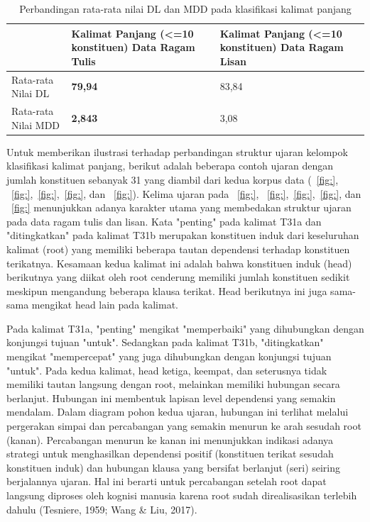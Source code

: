 \begin{table}
\begin{center}
 \label{table:DL_MDD_panjang}
 \caption{Perbandingan rata-rata nilai DL dan MDD pada klasifikasi kalimat panjang}
\begin{tabular}{ |p{4cm} | p{4cm} | p{4cm} |}
    \hline
 & Kalimat Panjang \newline (\textless =10 konstituen) \newline Data Ragam Tulis & Kalimat Panjang \newline (\textless =10 konstituen) \newline Data Ragam Lisan \\ \hline
 Rata-rata Nilai DL & \textbf{79,94} & 83,84 \\ \hline
 Rata-rata Nilai MDD & \textbf{2,843} & 3,08 \\ \hline
   \end{tabular}
\end{center}
\end{table}

Untuk memberikan ilustrasi terhadap perbandingan struktur ujaran kelompok klasifikasi kalimat panjang, berikut adalah beberapa contoh ujaran dengan jumlah konstituen sebanyak 31 yang diambil dari kedua korpus data (\pic~\ref{fig:}, \pic~\ref{fig:},\pic~\ref{fig:},\pic~\ref{fig:}, dan \pic~\ref{fig:}). Kelima ujaran pada \pic~\ref{fig:}, \pic~\ref{fig:},\pic~\ref{fig:},\pic~\ref{fig:}, dan \pic~\ref{fig:} menunjukkan adanya karakter utama yang membedakan struktur ujaran pada data ragam tulis dan lisan. Kata "penting" pada kalimat T31a dan "ditingkatkan" pada kalimat T31b merupakan konstituen induk dari keseluruhan kalimat (root) yang memiliki beberapa tautan dependensi terhadap konstituen terikatnya. Kesamaan kedua kalimat ini adalah bahwa konstituen induk (head) berikutnya yang diikat oleh root cenderung memiliki jumlah konstituen sedikit meskipun mengandung beberapa klausa terikat. Head berikutnya ini juga sama-sama mengikat head lain pada kalimat. 

Pada kalimat T31a, "penting" mengikat "memperbaiki" yang dihubungkan dengan konjungsi tujuan "untuk". Sedangkan pada kalimat T31b, "ditingkatkan" mengikat "mempercepat" yang juga dihubungkan dengan konjungsi tujuan "untuk". Pada kedua kalimat, head ketiga, keempat, dan seterusnya tidak memiliki tautan langsung dengan root, melainkan memiliki hubungan secara berlanjut. Hubungan ini membentuk lapisan level dependensi yang semakin mendalam. Dalam diagram pohon kedua ujaran, hubungan ini terlihat melalui pergerakan simpai dan percabangan yang semakin menurun ke arah sesudah root (kanan). Percabangan menurun ke kanan ini menunjukkan indikasi adanya strategi untuk menghasilkan dependensi positif (konstituen terikat sesudah konstituen induk) dan hubungan klausa yang bersifat berlanjut (seri) seiring berjalannya ujaran. Hal ini berarti untuk percabangan setelah root dapat langsung diproses oleh kognisi manusia karena root sudah direalisasikan terlebih dahulu (Tesniere, 1959; Wang & Liu, 2017). 

